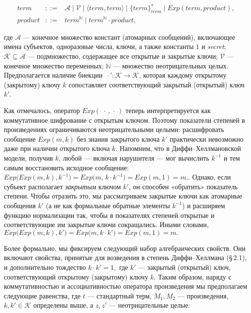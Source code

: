 \[
\begin{array}{lcl}
\mathit{term} &::=&
      \mathcal A
      \mid \mathcal V
      \mid \langle\mathit{term},\mathit{term}\rangle
      \mid \{\mathit{term}\}^{s}_{\mathit{term}}
      \mid Exp(\mathit{term},\mathit{product}),
\\[2pt]
\mathit{product} &::=&
      \mathit{term}^{\mathbb N}
      \mid \mathit{term}^{\mathbb N}\!\cdot \mathit{product},
\end{array}
\]

где $\mathcal A$ — конечное множество констант (атомарных сообщений),
включающее имена субъектов, одноразовые числа, ключи, а также
константы $1$ и \textit{secret};
$\mathcal K\subseteq\mathcal A$ — подмножество,
содержащее все открытые и закрытые ключи;
$\mathcal V$ — конечное множество переменных;
$\mathbb N$ — множество неотрицательных целых.
Предполагается наличие биекции $\,{\cdot}':\mathcal K\rightarrow\mathcal K$,
которая каждому открытому (закрытому) ключу $k$ сопоставляет
соответствующий закрытый (открытый) ключ $k'$.

Как отмечалось, оператор $Exp(\,\,\cdot\,,\,\cdot\,)$
теперь интерпретируется как коммутативное шифрование
с открытым ключом.
Поэтому показатели степеней в произведениях ограничиваются
неотрицательными целыми:
расшифровать сообщение $Exp(m,k)$ без знания закрытого ключа $k'$
практически невозможно даже при наличии открытого ключа $k$.
Напомним, что в Диффи–Хеллмановской модели,
получив $k$, любой — включая нарушителя — мог вычислить $k^{-1}$ и тем
самым восстановить исходное сообщение:
\(
   Exp\!\bigl(Exp(m,k),k^{-1}\bigr)=
   Exp\!\bigl(m,\,k\cdot k^{-1}\bigr)=
   Exp(m,1)=m.
\).
Однако, если субъект располагает \emph{закрытым} ключом $k'$,  
он способен «обратить» показатель степени.
Чтобы отразить это, мы рассматриваем закрытые ключи как
атомарные сообщения $k'$ (а не как формальные обратные элементы
$k^{-1}$) и расширяем функцию нормализации так, чтобы в показателях
степеней открытые и соответствующие им закрытые ключи сокращались.
Иными словами,
\(
   Exp\!\bigl(Exp(m,k),k'\bigr)=
   Exp\!\bigl(m,k\cdot k'\bigr)=
   Exp(m,1)=m.
\)

Более формально, мы фиксируем следующий набор алгебраических
свойств.  Они включают свойства, принятые для возведения в степень
Диффи–Хеллмана (§\,2.1), и дополнительно тождество
\(
   k\cdot k' = 1,
\)
где $k'$ — закрытый (открытый) ключ, соответствующий открытому
(закрытому) ключу $k$.
Таким образом, наряду с коммутативностью и ассоциативностью оператора
произведения мы предполагаем следующие равенства, где
$t$ — стандартный терм,
$M_{1},M_{2}$ — произведения,
$k,k'\in\mathcal K$ определены выше,
а $z,z'$ — неотрицательные целые:

